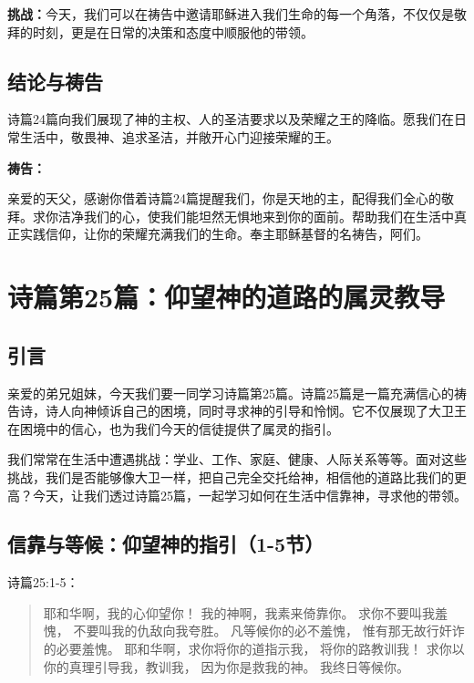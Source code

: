 \documentclass[a4paper, 12pt]{article}
\begin{document}
\textbf{挑战：}今天，我们可以在祷告中邀请耶稣进入我们生命的每一个角落，不仅仅是敬拜的时刻，更是在日常的决策和态度中顺服他的带领。

\subsection*{结论与祷告}
\hspace{0.6cm}诗篇24篇向我们展现了神的主权、人的圣洁要求以及荣耀之王的降临。愿我们在日常生活中，敬畏神、追求圣洁，并敞开心门迎接荣耀的王。

\textbf{祷告：}

亲爱的天父，感谢你借着诗篇24篇提醒我们，你是天地的主，配得我们全心的敬拜。求你洁净我们的心，使我们能坦然无惧地来到你的面前。帮助我们在生活中真正实践信仰，让你的荣耀充满我们的生命。奉主耶稣基督的名祷告，阿们。
\newpage


\section{诗篇第25篇：仰望神的道路的属灵教导}

\subsection*{引言}

\hspace{0.6cm}亲爱的弟兄姐妹，今天我们要一同学习诗篇第25篇。诗篇25篇是一篇充满信心的祷告诗，诗人向神倾诉自己的困境，同时寻求神的引导和怜悯。它不仅展现了大卫王在困境中的信心，也为我们今天的信徒提供了属灵的指引。

我们常常在生活中遭遇挑战：学业、工作、家庭、健康、人际关系等等。面对这些挑战，我们是否能够像大卫一样，把自己完全交托给神，相信他的道路比我们的更高？今天，让我们透过诗篇25篇，一起学习如何在生活中信靠神，寻求他的带领。

\subsection*{信靠与等候：仰望神的指引（1-5节）}

诗篇25:1-5：
\begin{quote}
耶和华啊，我的心仰望你！
我的神啊，我素来倚靠你。
求你不要叫我羞愧，
不要叫我的仇敌向我夸胜。
凡等候你的必不羞愧，
惟有那无故行奸诈的必要羞愧。
耶和华啊，求你将你的道指示我，
将你的路教训我！
求你以你的真理引导我，教训我，
因为你是救我的神。
我终日等候你。
\end{quote}
\end{document}

